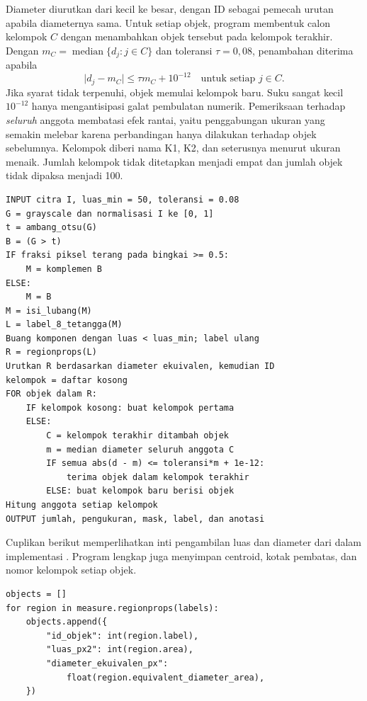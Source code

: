 Diameter diurutkan dari kecil ke besar, dengan ID sebagai pemecah urutan
apabila diameternya sama. Untuk setiap objek, program membentuk calon
kelompok $C$ dengan menambahkan objek tersebut pada kelompok terakhir.
Dengan $m_C=\operatorname{median}\{d_j:j\in C\}$ dan toleransi
$\tau=0{,}08$, penambahan diterima apabila
\begin{equation}
 \lvert d_j-m_C\rvert\leq\tau m_C+10^{-12}
 \quad\text{untuk setiap }j\in C.
 \label{eq:kelompok-koin}
\end{equation}
Jika syarat tidak terpenuhi, objek memulai kelompok baru. Suku sangat
kecil $10^{-12}$ hanya mengantisipasi galat pembulatan numerik. Pemeriksaan
terhadap \emph{seluruh} anggota membatasi efek rantai, yaitu penggabungan
ukuran yang semakin melebar karena perbandingan hanya dilakukan terhadap
objek sebelumnya. Kelompok diberi nama K1, K2, dan seterusnya menurut
ukuran menaik. Jumlah kelompok tidak ditetapkan menjadi empat dan jumlah
objek tidak dipaksa menjadi 100.

\noindent\begin{minipage}{\textwidth}
\begin{lstlisting}[style=pseudocode,caption={Alur penghitungan koin menurut ukuran.}]
INPUT citra I, luas_min = 50, toleransi = 0.08
G = grayscale dan normalisasi I ke [0, 1]
t = ambang_otsu(G)
B = (G > t)
IF fraksi piksel terang pada bingkai >= 0.5:
    M = komplemen B
ELSE:
    M = B
M = isi_lubang(M)
L = label_8_tetangga(M)
Buang komponen dengan luas < luas_min; label ulang
R = regionprops(L)
Urutkan R berdasarkan diameter ekuivalen, kemudian ID
kelompok = daftar kosong
FOR objek dalam R:
    IF kelompok kosong: buat kelompok pertama
    ELSE:
        C = kelompok terakhir ditambah objek
        m = median diameter seluruh anggota C
        IF semua abs(d - m) <= toleransi*m + 1e-12:
            terima objek dalam kelompok terakhir
        ELSE: buat kelompok baru berisi objek
Hitung anggota setiap kelompok
OUTPUT jumlah, pengukuran, mask, label, dan anotasi
\end{lstlisting}
\end{minipage}

Cuplikan berikut memperlihatkan inti pengambilan luas dan diameter dari
 dalam implementasi . Program lengkap
juga menyimpan centroid, kotak pembatas, dan nomor kelompok setiap objek.

\noindent\begin{minipage}{\textwidth}
\begin{lstlisting}[style=pythoncode,caption={Inti pengukuran wilayah berlabel.}]
objects = []
for region in measure.regionprops(labels):
    objects.append({
        "id_objek": int(region.label),
        "luas_px2": int(region.area),
        "diameter_ekuivalen_px":
            float(region.equivalent_diameter_area),
    })
\end{lstlisting}
\end{minipage}


